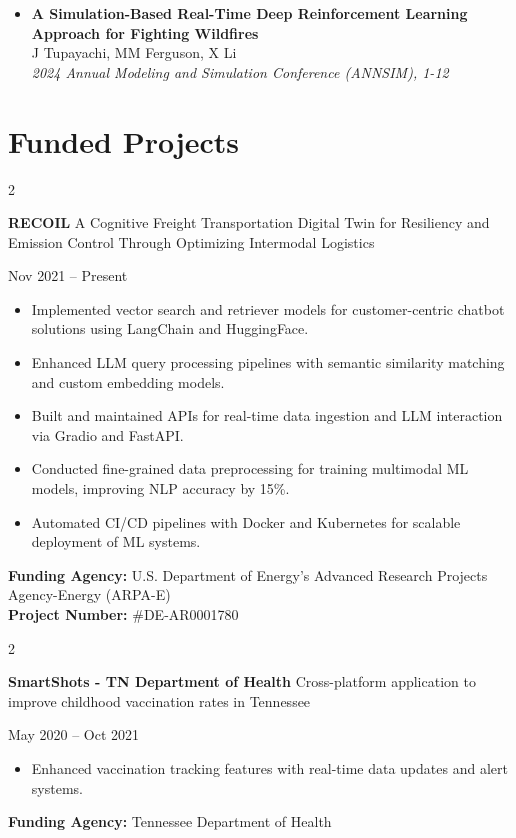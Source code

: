 \documentclass[10pt, letterpaper]{article}
\newenvironment{highlights}{
    \begin{itemize}[
        topsep=0.10 cm,
        parsep=0.10 cm,
        partopsep=0pt,
        itemsep=0pt,
        leftmargin=0 cm + 10pt
    ]
}{
    \end{itemize}
} %
\newenvironment{twocolentry}[2][]{
    \onecolentry
    \def\secondColumn{#2}
    \setcolumnwidth{\fill, 4.5 cm}
    \begin{paracol}{2}
}{
    \switchcolumn \raggedleft \secondColumn
    \end{paracol}
    \endonecolentry
} %
\begin{document}
\begin{itemize}[left=0pt]
        \item \textbf{A Simulation-Based Real-Time Deep Reinforcement Learning Approach for Fighting Wildfires} \\
        J Tupayachi, MM Ferguson, X Li \\
        \textit{2024 Annual Modeling and Simulation Conference (ANNSIM), 1-12} \\
    \end{itemize}
    



        \section*{Funded Projects}

        \begin{twocolentry}{Nov 2021 – Present}
            \textbf{RECOIL} 
            \textbar A Cognitive Freight Transportation Digital Twin for Resiliency and Emission Control Through Optimizing Intermodal Logistics
        \end{twocolentry}
        \begin{highlights}
            \item Implemented vector search and retriever models for customer-centric chatbot solutions using LangChain and HuggingFace.
            \item Enhanced LLM query processing pipelines with semantic similarity matching and custom embedding models.
            \item Built and maintained APIs for real-time data ingestion and LLM interaction via Gradio and FastAPI.
            \item Conducted fine-grained data preprocessing for training multimodal ML models, improving NLP accuracy by 15\%.
            \item Automated CI/CD pipelines with Docker and Kubernetes for scalable deployment of ML systems.
        \end{highlights}
        \vspace{0.3cm}
        \noindent \textbf{Funding Agency:} U.S. Department of Energy’s Advanced Research Projects Agency-Energy (ARPA-E) \\
        \noindent \textbf{Project Number:} \#DE-AR0001780
        
        \vspace{0.3cm}
        \begin{twocolentry}{May 2020 – Oct 2021}
            \textbf{SmartShots - TN Department of Health} \textbar Cross-platform application to improve childhood vaccination rates in Tennessee
        \end{twocolentry}
        \begin{highlights}
            \item Enhanced vaccination tracking features with real-time data updates and alert systems.
        \end{highlights}
        \vspace{0.3cm}
        \noindent \textbf{Funding Agency:} Tennessee Department of Health
        
\end{document}
